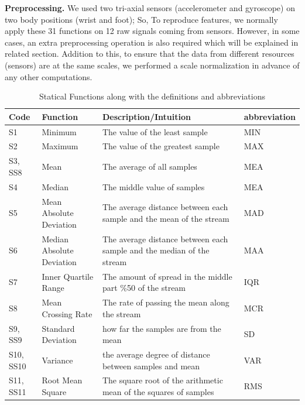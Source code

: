 \documentclass[journal,article,submit,moreauthors,pdftex]{Definitions/mdpi}
\begin{document}
\noindent\textbf{Preprocessing.} We used two tri-axial sensors (accelerometer and gyroscope) on two body positions (wrist and foot); So, To reproduce features, we normally apply these 31 functions on 12 raw signals coming from sensors. However, in some cases, an extra preprocessing operation is also required which will be explained in related section. Addition to this, to ensure that the data from different resources (sensors) are at the same scales, we performed a scale normalization in advance of any other computations.
\begin{table}[H]
	\caption{Statical Functions along with the definitions and abbreviations }
	\centering
	\begin{tabular}{p{0.9cm}p{5cm}p{7cm}p{1.3cm}}
		\toprule
		\textbf{Code} & \textbf{Function} & \textbf{Description/Intuition} & \textbf{{\scriptsize abbreviation}} \\
		\midrule
		{\footnotesize S1}&Minimum & {\scriptsize The value of the least sample}& MIN\\
		S2&Maximum & {\scriptsize The value of the greatest sample}& MAX\\
		{\footnotesize S3, SS8}&Mean&  {\scriptsize The average of all samples}& MEA\\
		{\footnotesize S4}&Median&  {\scriptsize The middle value of samples}& MEA\\
		{\footnotesize S5}&{\footnotesize Mean Absolute Deviation}& {\scriptsize The average distance between each sample and the mean of the stream}& MAD\\
		{\footnotesize S6}&{\footnotesize Median Absolute Deviation}& {\scriptsize The average distance between each sample and the median of the stream}& MAA\\
		{\footnotesize S7}&Inner Quartile Range  & {\scriptsize The amount of spread in the middle part \%50 of the stream}& IQR\\
		{\footnotesize S8}&Mean Crossing Rate& {\scriptsize The rate of passing the mean along the stream}& MCR\\
		{\footnotesize S9, SS9}&Standard Deviation& {\scriptsize how far the samples are from the mean}& SD\\
		{\footnotesize S10, SS10}&Variance& {\scriptsize the average degree of distance between samples and mean}& VAR\\
		{\footnotesize S11, SS11}&Root Mean Square& {\scriptsize The square root of the arithmetic mean of the squares of samples}& RMS\\

\end{tabular}
\end{table}
\end{document}

